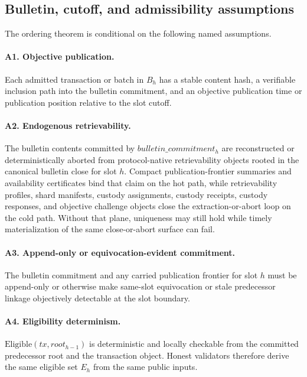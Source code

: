 \documentclass[11pt]{article}
\begin{document}
\subsection{Bulletin, cutoff, and admissibility assumptions}

The ordering theorem is conditional on the following named assumptions.

\paragraph{A1. Objective publication.}
Each admitted transaction or batch in \(B_h\) has a stable content hash, a
verifiable inclusion path into the bulletin commitment, and an objective
publication time or publication position relative to the slot cutoff.

\paragraph{A2. Endogenous retrievability.}
The bulletin contents committed by \(bulletin\_commitment_h\) are reconstructed
or deterministically aborted from protocol-native retrievability objects rooted
in the canonical bulletin close for slot \(h\). Compact publication-frontier
summaries and availability certificates bind that claim on the hot path, while
retrievability profiles, shard manifests, custody assignments, custody
receipts, custody responses, and objective challenge objects close the
extraction-or-abort loop on the cold path.
Without that plane, uniqueness may still hold while timely materialization of
the same close-or-abort surface can fail.

\paragraph{A3. Append-only or equivocation-evident commitment.}
The bulletin commitment and any carried publication frontier for slot \(h\)
must be append-only or otherwise make same-slot equivocation or stale
predecessor linkage objectively detectable at the slot boundary.

\paragraph{A4. Eligibility determinism.}
\(\mathrm{Eligible}(tx, root_{h-1})\) is deterministic and locally checkable
from the committed predecessor root and the transaction object. Honest
validators therefore derive the same eligible set \(E_h\) from the same public
inputs.
\end{document}
